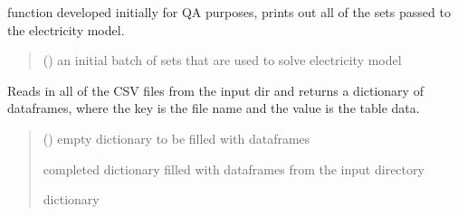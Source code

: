 \documentclass[letterpaper,10pt,english]{sphinxmanual}
\begin{document}
\begin{fulllineitems}
\label{\detokenize{src.models.electricity.scripts.preprocessor:src.models.electricity.scripts.preprocessor.print_sets}}
\pysigstartsignatures
\pysiglinewithargsret
{}
{}
{}
\pysigstopsignatures
\sphinxAtStartPar
function developed initially for QA purposes, prints out all of the sets passed to the
electricity model.
\begin{quote}\begin{description}
\sphinxAtStartPar
{} ({\hyperref[\detokenize{src.models.electricity.scripts.preprocessor:src.models.electricity.scripts.preprocessor.Sets}]{}}) \textendash{} an initial batch of sets that are used to solve electricity model

\end{description}\end{quote}

\end{fulllineitems}


\begin{fulllineitems}
\label{\detokenize{src.models.electricity.scripts.preprocessor:src.models.electricity.scripts.preprocessor.readin_csvs}}
\pysigstartsignatures
\pysiglinewithargsret
{}
{}
{}
\pysigstopsignatures
\sphinxAtStartPar
Reads in all of the CSV files from the input dir and returns a dictionary of dataframes,
where the key is the file name and the value is the table data.
\begin{quote}\begin{description}
\sphinxAtStartPar
{} () \textendash{} empty dictionary to be filled with dataframes

\sphinxAtStartPar
completed dictionary filled with dataframes from the input directory

\sphinxAtStartPar
dictionary

\end{description}\end{quote}

\end{fulllineitems}
\end{document}
